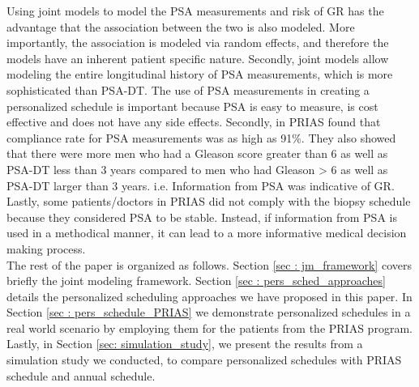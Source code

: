 Using joint models to model the PSA measurements and risk of GR has the advantage that the association between the two is also modeled. More importantly, the association is modeled via random effects, and therefore the models have an inherent patient specific nature. Secondly, joint models allow modeling the entire longitudinal history of PSA measurements, which is more sophisticated than PSA-DT. The use of PSA measurements in creating a personalized schedule is important because PSA is easy to measure, is cost effective and does not have any side effects. Secondly, in PRIAS \cite{bokhorst2015compliance} found that compliance rate for PSA measurements was as high as 91\%. They also showed that there were more men who had a Gleason score greater than 6 as well as PSA-DT less than 3 years compared to men who had Gleason > 6 as well as PSA-DT larger than 3 years. i.e. Information from PSA was indicative of GR. Lastly, some patients/doctors in PRIAS did not comply with the biopsy schedule because they considered PSA to be stable. Instead, if information from PSA is used in a methodical manner, it can lead to a more informative medical decision making process.\\

The rest of the paper is organized as follows. Section \ref{sec : jm_framework} covers briefly the joint modeling framework. Section \ref{sec : pers_sched_approaches} details the personalized scheduling approaches we have proposed in this paper. In Section \ref{sec : pers_schedule_PRIAS} we demonstrate personalized schedules in a real world scenario by employing them for the patients from the PRIAS program. Lastly, in Section \ref{sec: simulation_study}, we present the results from a simulation study we conducted, to compare personalized schedules with PRIAS schedule and annual schedule.